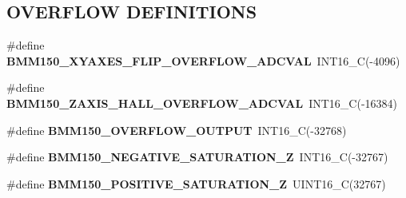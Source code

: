 \subsection*{O\+V\+E\+R\+F\+L\+OW D\+E\+F\+I\+N\+I\+T\+I\+O\+NS}
\begin{DoxyCompactItemize}
\item 
\mbox{\label{group___b_m_m150_ga5b1ad35c05f2ab9b39dc5539ee6e57fd}} 
\#define {\bfseries B\+M\+M150\+\_\+\+X\+Y\+A\+X\+E\+S\+\_\+\+F\+L\+I\+P\+\_\+\+O\+V\+E\+R\+F\+L\+O\+W\+\_\+\+A\+D\+C\+V\+AL}~I\+N\+T16\+\_\+C(-\/4096)
\item 
\mbox{\label{group___b_m_m150_ga75ac50a30d683f82dca4bda240f0211b}} 
\#define {\bfseries B\+M\+M150\+\_\+\+Z\+A\+X\+I\+S\+\_\+\+H\+A\+L\+L\+\_\+\+O\+V\+E\+R\+F\+L\+O\+W\+\_\+\+A\+D\+C\+V\+AL}~I\+N\+T16\+\_\+C(-\/16384)
\item 
\mbox{\label{group___b_m_m150_ga85e4e11bb8df5c7f08393c5c053f7313}} 
\#define {\bfseries B\+M\+M150\+\_\+\+O\+V\+E\+R\+F\+L\+O\+W\+\_\+\+O\+U\+T\+P\+UT}~I\+N\+T16\+\_\+C(-\/32768)
\item 
\mbox{\label{group___b_m_m150_gabc605b18893625684b0437db47363897}} 
\#define {\bfseries B\+M\+M150\+\_\+\+N\+E\+G\+A\+T\+I\+V\+E\+\_\+\+S\+A\+T\+U\+R\+A\+T\+I\+O\+N\+\_\+Z}~I\+N\+T16\+\_\+C(-\/32767)
\item 
\mbox{\label{group___b_m_m150_ga370302c1b320bb1de22d96aa6a48fbd9}} 
\#define {\bfseries B\+M\+M150\+\_\+\+P\+O\+S\+I\+T\+I\+V\+E\+\_\+\+S\+A\+T\+U\+R\+A\+T\+I\+O\+N\+\_\+Z}~U\+I\+N\+T16\+\_\+C(32767)
\end{DoxyCompactItemize}
